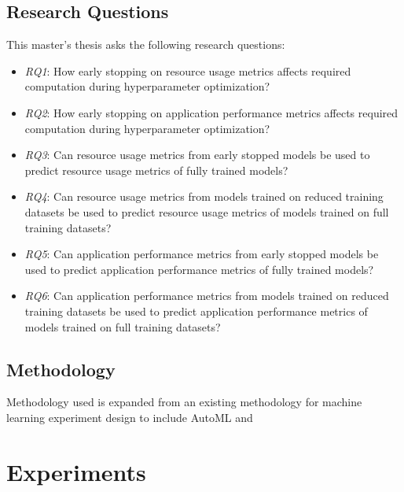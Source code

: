 \subsection{Research Questions}
This master's thesis asks the following research questions:
\begin{itemize}
    \item \emph{RQ1}: How early stopping on resource usage metrics affects required computation during hyperparameter optimization?
    \item \emph{RQ2}: How early stopping on application performance metrics affects required computation during hyperparameter optimization?
    \item \emph{RQ3}: Can resource usage metrics from early stopped models be used to predict resource usage metrics of fully trained models?
    \item \emph{RQ4}: Can resource usage metrics from models trained on reduced training datasets be used to predict resource usage metrics of models trained on full training datasets?
    \item \emph{RQ5}: Can application performance metrics from early stopped models be used to predict application performance metrics of fully trained models?
    \item \emph{RQ6}: Can application performance metrics from models trained on reduced training datasets be used to predict application performance metrics of models trained on full training datasets?
\end{itemize}

\subsection{Methodology}

Methodology used is expanded from an existing methodology for machine learning experiment design \parencite{fernandez-lozanoMethodologyDesignExperiments2016} to include AutoML and

\section{Experiments}
\label{sec:experiments}
